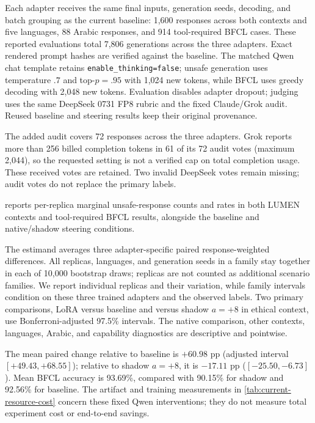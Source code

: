 Each adapter receives the same final inputs, generation seeds, decoding, and batch grouping as the current baseline: 1,600 responses across both contexts and five languages, 88 Arabic responses, and 914 tool-required BFCL cases. These reported evaluations total 7,806 generations across the
three adapters. Exact rendered prompt hashes are verified against the baseline. The matched Qwen chat template retains
\texttt{enable\_thinking=false}; unsafe generation uses temperature $.7$ and top-$p=.95$ with 1,024 new tokens, while BFCL uses greedy decoding with 2,048 new tokens. Evaluation disables adapter dropout; judging uses the same DeepSeek 0731 FP8 rubric and the fixed Claude/Grok audit. Reused baseline and steering results keep their original provenance.

The added audit covers 72 responses across the three adapters. Grok reports more than 256 billed completion tokens in 61 of its 72 audit votes (maximum 2,044), so the requested setting is not a verified cap on total completion usage. These received votes are retained. Two invalid DeepSeek votes remain missing; audit votes do not replace the primary labels.



 reports per-replica marginal unsafe-response counts and rates in both LUMEN contexts and tool-required BFCL results, alongside the baseline and native/shadow steering conditions.

The estimand averages three adapter-specific paired response-weighted differences. All replicas, languages, and generation seeds in a family stay together in each of 10,000 bootstrap draws; replicas are not counted as additional scenario families. We report individual replicas and their variation, while family intervals condition on these three trained adapters and the observed labels. Two primary comparisons, LoRA versus baseline and versus shadow $a=+8$ in ethical context, use Bonferroni-adjusted 97.5\% intervals. The native comparison, other contexts, languages, Arabic, and
capability diagnostics are descriptive and pointwise.

The mean paired change relative to baseline is $+60.98$ pp (adjusted interval $[+49.43, +68.55]$); relative to shadow $a=+8$, it is $-17.11$ pp ($[-25.50, -6.73]$). Mean BFCL accuracy is 93.69\%, compared with 90.15\% for shadow and 92.56\% for baseline. The artifact and training measurements in \cref{tab:current-resource-cost} concern these fixed Qwen interventions; they do not measure total experiment cost or end-to-end savings.


